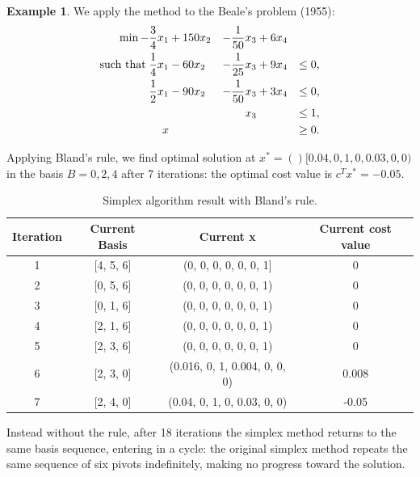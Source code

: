 \documentclass[a4paper,10 pt,titlepage,twoside]{book}
\theoremstyle{plain}
\theoremstyle{definition}
\newtheorem{ex}[thm]{Example}
\theoremstyle{remark}
\begin{document}
\begin{ex}
	We apply the method to the Beale's problem (1955): %
	\begin{alignat*}{4}
	\min -\frac{3}{4}x_{1}&+150x_{2}&-\frac{1}{50}x_{3}&+6x_{4}&\\
	\text{such that\;}\frac{1}{4}x_{1}&-60x_{2}&-\frac{1}{25}x_{3}&+9x_{4}&\leq 0,\\
	\frac{1}{2}x_{1}&-90x_{2}&-\frac{1}{50}x_{3}&+3x_{4}&\leq 0,\\
	&\;&x_{3}&\;&\leq 1,\\
	x&\;&\;&\;&\geq 0.\\
	\end{alignat*}
	
Applying Bland's rule, we find optimal solution at $x^{*} = ()[0.04, 0,  1,   0,  0.03, 0,   0  )$ in the basis $B = {0, 2, 4}$ after 7 iterations: the optimal cost value is $c^{T}x^{*} = -0.05$.\\

\begin{table}[h]
	\begin{center}
	\begin{tabular}{cccc}
		\hline
		\textbf{Iteration} & \textbf{Current Basis} & \textbf{Current x} & \textbf{Current cost value} \\ \hline
		1 & [4, 5, 6] & (0, 0, 0, 0, 0, 0, 1] & 0 \\
		2 & [0, 5, 6] & (0, 0, 0, 0, 0, 0, 1) & 0 \\
		3 & [0, 1, 6] & (0, 0, 0, 0, 0, 0, 1) & 0 \\
		4 & [2, 1, 6] & (0, 0, 0, 0, 0, 0, 1) & 0 \\
		5 & [2, 3, 6] & (0, 0, 0, 0, 0, 0, 1) & 0 \\
		6 & [2, 3, 0] & (0.016, 0, 1, 0.004, 0, 0, 0) & 0.008 \\
		7 & [2, 4, 0] & (0.04, 0, 1, 0, 0.03, 0, 0) & -0.05 \\ \hline
	\end{tabular}\caption{Simplex algorithm result with Bland's rule.}
\end{center}
\end{table}

Instead without the rule, after 18 iterations the simplex method returns to the same basis sequence, entering in a cycle: the original simplex method repeats the same sequence of six pivots indefinitely, making no progress toward the solution.


\end{ex}
\end{document}
